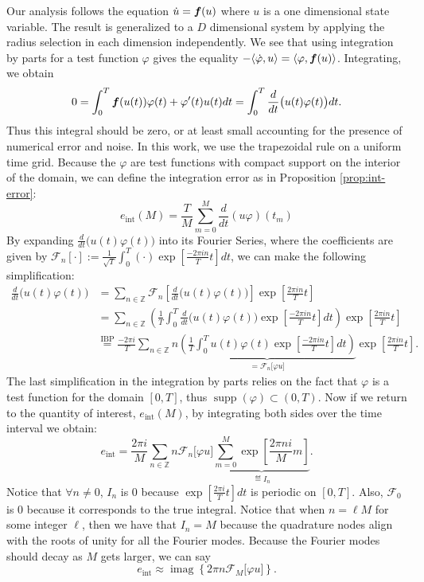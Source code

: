 Our analysis follows the equation $\dot{u}=\boldsymbol{f}(u)$ where $u$ is a one dimensional state variable. The result is generalized to a $D$ dimensional system by applying the radius selection in each dimension independently. We see that using integration by parts for a test function $\varphi$ gives the equality $-\langle \dot{\varphi}, u\rangle = \langle \varphi, \boldsymbol{f}(u) \rangle$. Integrating, we obtain
\[0 =  \int_0^T \boldsymbol{f}(u(t))\varphi(t) + \varphi'(t)u(t) dt = \int_0^T \frac{d}{dt}\bigl(u(t)\varphi(t)\bigr) dt. \]
Thus this integral should be zero, or at least small accounting for the presence of numerical error and noise. In this work, we use the trapezoidal rule on a uniform time grid. Because the $\varphi$ are test functions with compact support on the interior of the domain, we can define the integration error as in Proposition \ref{prop:int-error}: 
\begin{equation} \label{eq:eint} 
    e_\text{int}(M) = \frac{T}{M}\sum_{m=0}^M \frac{d}{dt}(u \varphi) (t_m)
\end{equation}
By expanding $\frac{d}{dt}\bigl(u(t) \varphi(t)\bigr)$ into its Fourier Series, where the coefficients are given by $\mathcal{F}_n[\cdot] := \frac{1}{\sqrt{T}}\int_0^T (\cdot) \exp\left[\frac{-2\pi i n }{T}t\right] dt$, we can make the following simplification:
\begin{align*} 
	\frac{d}{dt}\bigl(u(t)\varphi(t)\bigr) &= \sum_{n\in\mathbb{Z}} \mathcal{F}_n \left[\frac{d}{dt}\bigl(u(t)\varphi(t)\bigr)\right] \exp \left[\frac{ 2\pi i n}{T}t\right]\\
	&= \sum_{n\in\mathbb{Z}} \left(\frac{1}{T} \int_0^T \frac{d}{dt}\bigl(u(t)\varphi(t)\bigr)  \exp \left[\frac{ -2\pi i n}{T}t\right] dt\right)  \exp \left[\frac{ 2\pi i n}{T}t\right]\\
	&\stackrel{\text{IBP}}{=} \frac{ -2\pi i }{T} \sum_{n\in\mathbb{Z}} n\underbrace{\left( \frac{1}{T} \int_0^T u(t)\varphi(t)  \exp \left[\frac{ -2\pi i n}{T}t\right] dt \right)}_{=\mathcal{F}_n\bigl[\varphi u\bigr]}  \exp \left[\frac{ 2\pi i n}{T}t\right].
\end{align*} 
The last simplification in the integration by parts relies on the fact that $\varphi$ is a test function for the domain $[0,T]$, thus $\operatorname{supp}(\varphi) \subset (0,T)$. Now if we return to the quantity of interest, $e_{\text{int}}(M)$, by integrating both sides over the time interval we obtain: 
\[e_\text{int} = \frac{2\pi i}{M} \sum_{n\in\mathbb{Z}} n \mathcal{F}_n\bigl[\varphi u\bigr]\underbrace{\sum_{m=0}^M  \exp \left[\frac{ 2\pi n i }{M}m\right] }_{\eqdef I_n}.\] 
Notice that $\forall n \neq 0$, $I_n$ is 0 because $\exp\left[\tfrac{2\pi i}{T}t\right]dt$ is periodic on $[0,T]$. Also, $\mathcal{F}_0$ is 0 because it corresponds to the true integral. Notice that when $n = \ell M$ for some integer $\ell$, then we have that $I_{n} = M$ because the quadrature nodes align with the roots of unity for all the Fourier modes. Because the Fourier modes should decay as $M$ gets larger, we can say 
\[e_\text{int} \approx \operatorname{imag}\left\{ 2\pi n \mathcal{F}_M\bigl[\varphi u\bigr]\right\}.\]

